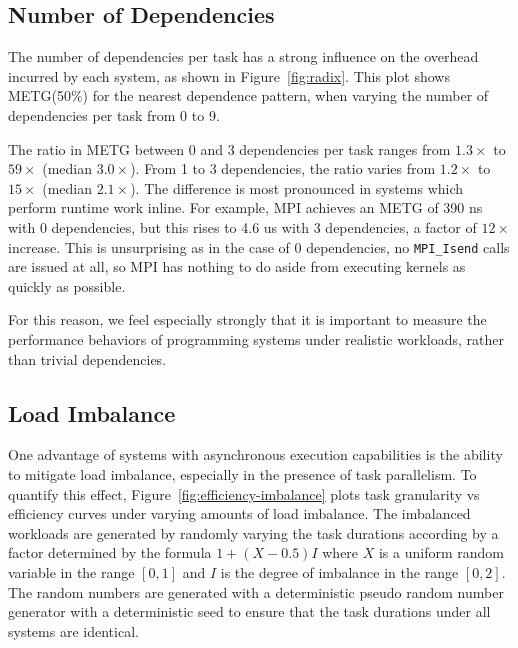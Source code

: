 

\subsection{Number of Dependencies}
\label{subsec:number-of-dependencies}



The number of dependencies per task has a strong influence on the
overhead incurred by each system, as shown in
Figure~\ref{fig:radix}. This plot shows METG(50\%) for the nearest
dependence pattern, when varying the number of dependencies per task
from 0 to 9.


The ratio in METG between 0 and 3 dependencies per task ranges from
$1.3\times$ to $59\times$ (median $3.0\times$). From 1 to 3
dependencies, the ratio varies from $1.2\times$ to $15\times$ (median
$2.1\times$). The difference is most pronounced in systems which
perform runtime work inline. For example, MPI achieves an METG of 390
ns with 0 dependencies, but this rises to 4.6 us with 3 dependencies,
a factor of $12\times$ increase. This is unsurprising as in the case
of 0 dependencies, no \lstinline[language=C++]{MPI_Isend} calls are
issued at all, so MPI has nothing to do aside from executing kernels
as quickly as possible.

For this reason, we feel especially strongly that it is important to
measure the performance behaviors of programming systems under
realistic workloads, rather than trivial dependencies.

\subsection{Load Imbalance}



One advantage of systems with asynchronous execution capabilities is
the ability to mitigate load imbalance, especially in the presence of
task parallelism. To quantify this effect,
Figure~\ref{fig:efficiency-imbalance} plots task granularity vs
efficiency curves under varying amounts of load imbalance. The
imbalanced workloads are generated by randomly varying the task
durations according by a factor determined by the formula $1+(X-0.5)I$
where $X$ is a uniform random variable in the range $[0,1]$ and $I$ is
the degree of imbalance in the range $[0,2]$. The random numbers are
generated with a deterministic pseudo random number generator with a
deterministic seed to ensure that the task durations under all systems
are identical.

